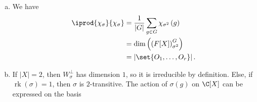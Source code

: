 \documentclass[10pt]{mypackage}
\begin{document}
\begin{solution}
\begin{enumerate}[(a)]
      \begin{align*}
        g\cdot \left( x,y \right) &= \left( g\cdot x,g\cdot y \right)\\
                                  &= \left( x,y \right),
      \end{align*}
      meaning that $x$ and $y$ are both in $\operatorname{fix}\left( g \right)$. In particular, this means that 
      \begin{align*}
        \operatorname{fix}_{\sigma^2}(g) &= \set{x_1,\dots,x_r}\times \set{x_1,\dots,x_r},
      \end{align*}
      whence there are $r^2$ such elements.
      \begin{align*}
        \chi_{\sigma^2}\left( g \right) &= \left\vert \operatorname{fix}_{\sigma^2}\left( g \right) \right\vert\\
                                        &= \left\vert \operatorname{fix}\left( g \right) \right\vert^2
      \end{align*}
      In particular, this gives that
      \begin{align*}
        \chi_{\sigma}\left( g \right) \overline{\chi_{\sigma}\left( g \right)} &= \left\vert \operatorname{fix}_{\sigma}\left( g \right) \right\vert^2\\
                                                                               &= \left\vert \operatorname{fix}_{\sigma^2}\left( g \right) \right\vert\\
                                                                               &= \chi_{\sigma^2}\left( g \right).
      \end{align*}
    \item We have
      \begin{align*}
        \iprod{\chi_{\sigma}}{\chi_{\sigma}} &= \frac{1}{\left\vert G \right\vert}\sum_{g\in G} \chi_{\sigma^2}\left( g \right)\\
                                             &= \dim\left( \left( F[X] \right)_{\sigma^2}^{G} \right)\\
                                             &= \left\vert \set{O_1,\dots,O_r} \right\vert.
      \end{align*}
    \item If $\left\vert X \right\vert = 2$, then $W_{\sigma}^{\perp}$ has dimension $1$, so it is irreducible by definition. Else, if $\operatorname{rk}\left( \sigma \right) = 1$, then $\sigma$ is $2$-transitive. The action of $\sigma\left( g \right)$ on $\C[X]$ can be expressed on the basis

\end{enumerate}
\end{solution}
\end{document}
